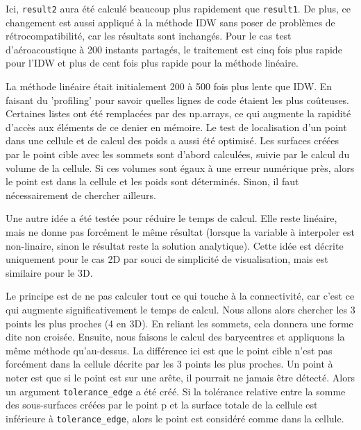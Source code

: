 Ici, \texttt{result2} aura été calculé beaucoup plus rapidement que \texttt{result1}. De plus, ce changement est aussi appliqué à la méthode IDW sans poser de problèmes de rétrocompatibilité, car les résultats sont inchangés. Pour le cas test d'aéroacoustique à 200 instants partagés, le traitement est cinq fois plus rapide pour l'IDW et plus de cent fois plus rapide pour la méthode linéaire.




\vspace{0.5cm}

La méthode linéaire était initialement 200 à 500 fois plus lente que IDW. En faisant du 'profiling' pour savoir quelles lignes de code étaient les plus coûteuses. Certaines listes ont été remplacées par des np.arrays, ce qui augmente la rapidité d'accès aux éléments de ce denier en mémoire.
Le test de localisation d'un point dans une cellule et de calcul des poids a aussi été optimisé.
Les surfaces créées par le point cible avec les sommets sont d'abord calculées, suivie par le calcul du volume de la cellule. Si ces volumes sont égaux à une erreur numérique près, alors le point est dans la cellule et les poids sont déterminés. Sinon, il faut nécessairement de chercher ailleurs.

\vspace{0.5cm}

Une autre idée a été testée pour réduire le temps de calcul. Elle reste linéaire, mais ne donne pas forcément le même résultat (lorsque la variable à interpoler est non-linaire, sinon le résultat reste la solution analytique). Cette idée est décrite uniquement pour le cas 2D par souci de simplicité de visualisation, mais est similaire pour le 3D.

Le principe est de ne pas calculer tout ce qui touche à la connectivité, car c'est ce qui augmente significativement le temps de calcul.
Nous allons alors chercher les 3 points les plus proches (4 en 3D). En reliant les sommets, cela donnera une forme dite non croisée. 
Ensuite, nous faisons le calcul des barycentres et appliquons la même méthode qu'au-dessus.
La différence ici est que le point cible n'est pas forcément dans la cellule décrite par les 3 points les plus proches.
Un point à noter est que si le point est sur une arête, il pourrait ne jamais être détecté. Alors un argument \texttt{tolerance\_edge} a été créé. Si la tolérance relative entre la somme des sous-surfaces créées par le point p et la surface totale de la cellule est inférieure à \texttt{tolerance\_edge}, alors le point est considéré comme dans la cellule.%


